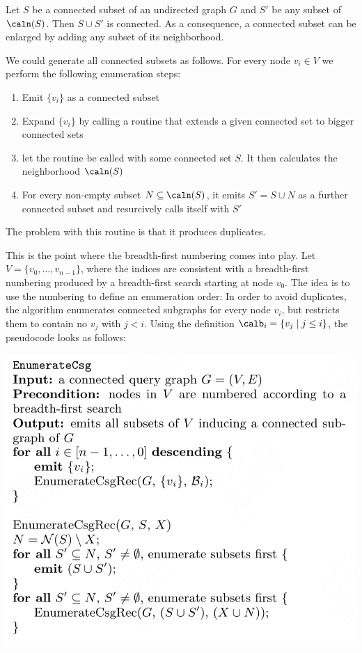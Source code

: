 \documentclass[11pt]{article}
\begin{document}
Let \(S\) be a connected subset of an undirected graph \(G\) and \(S'\) be any subset of \(\caln(S)\).
Then \(S\cup S'\) is connected. As a consequence, a connected subset can be enlarged by adding any
subset of its neighborhood.

We could generate all connected subsets as follows. For every node \(v_i\in V\) we perform the
following enumeration steps:
\begin{enumerate}
\item Emit \(\{v_i\}\) as a connected subset
\item Expand \(\{v_i\}\) by calling a routine that extends a given connected set to bigger connected sets
\item let the routine be called with some connected set \(S\). It then calculates the neighborhood
\(\caln(S)\)
\item For every non-empty subset \(N\subseteq\caln(S)\), it emits \(S'=S\cup N\) as a further connected
subset and resurcively calls itself with \(S'\)
\end{enumerate}
The problem with this routine is that it produces duplicates.

This is the point where the breadth-first numbering comes into play. Let \(V=\{v_0,\dots,v_{n-1}\}\),
where the indices are consistent with a breadth-first numbering produced by a breadth-first search
starting at node \(v_0\). The idea is to use the numbering to define an enumeration order: In order to
avoid duplicates, the algorithm enumerates connected subgraphs for every node \(v_i\), but restricts
them to contain no \(v_j\) with \(j<i\). Using the definition \(\calb_i=\{v_j\mid j\le i\}\), the
pseudocode looks as follows:


\begin{center}
\includegraphics[width=.8\textwidth]{../../images/papers/101.png}
\end{center}
\end{document}
